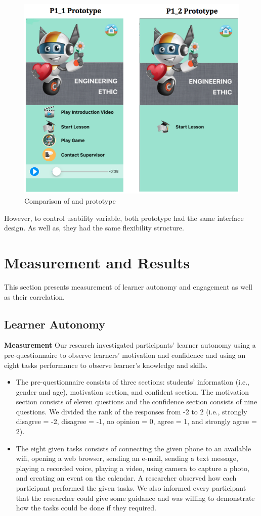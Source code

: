 \begin{figure}[H]
\centering
\includegraphics[width=0.6 \textwidth]{compare1}
\caption{Comparison of  and  prototype}
\end{figure}

However, to control usability variable, both prototype had the same interface design. As well as, they had the same flexibility structure. 


\section{Measurement and Results} 

This section presents measurement of learner autonomy and engagement as well as their correlation. 

\subsection{Learner Autonomy}
\noindent\textbf{Measurement} 
\newline
Our research investigated participants' learner autonomy using a pre-questionnaire to observe learners' motivation and confidence and using an eight tasks performance to observe learner's knowledge and skills.
\begin{itemize} 
\item The pre-questionnaire consists of three sections: students' information (i.e., gender and age), motivation section, and confident section. The motivation section consists of eleven questions and the confidence section consists of nine questions. We divided the rank of the responses from -2 to 2 (i.e., strongly disagree = -2, disagree = -1, no opinion = 0, agree = 1, and strongly agree = 2). 

\item The eight given tasks consists of connecting the given phone to an available wifi, opening a web browser, sending an e-mail, sending a text message, playing a recorded voice, playing a video, using camera to capture a photo, and creating an event on the calendar. A researcher observed how each participant performed the given tasks. We also informed every participant that the researcher could give some guidance and was willing to demonstrate how the tasks could be done if they required. 
\end{itemize}

